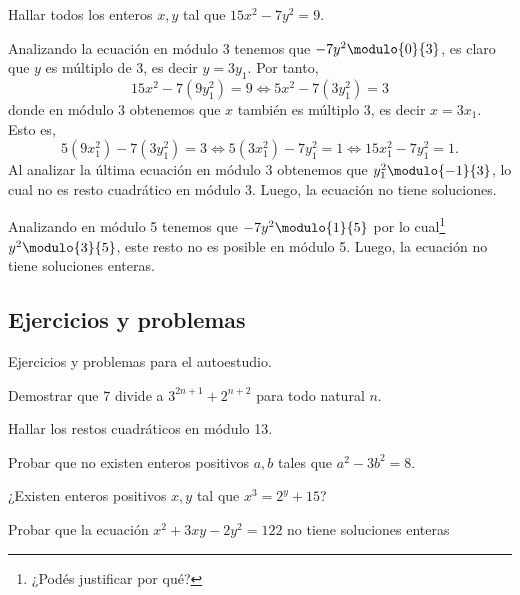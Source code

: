 \begin{example}
    Hallar todos los enteros $x,y$ tal que $15x^2 - 7y^2 = 9$.
\end{example}
\begin{solution}[1]
    Analizando la ecuación en módulo 3 tenemos que $-7y^2 \modulo{0}{3}$, es claro que $y$ es múltiplo de 3, es decir $y = 3y_1$.
    Por tanto,
    \[
        15x^2 - 7(9y_1^2) = 9 \iff 5x^2 - 7(3y_1^2) = 3
    \]
    donde en módulo 3 obtenemos que $x$ también es múltiplo 3, es decir $x = 3x_1$.
    Esto es,
    \[
        5(9x_1^2) - 7(3y_1^2) = 3 \iff 5(3x_1^2) - 7y_1^2 = 1 \iff 15x_1^2 - 7y_1^2 = 1.
    \]
    Al analizar la última ecuación en módulo 3 obtenemos que $y_1^2 \modulo{-1}{3}$, lo cual no es resto cuadrático en módulo 3.
    Luego, la ecuación no tiene soluciones.
\end{solution}

\begin{solution}[2]
    Analizando en módulo 5 tenemos que $-7y^2 \modulo{1}{5}$ por lo cual\footnote{¿Podés justificar por qué?} $y^2 \modulo{3}{5}$,
    este resto no es posible en módulo 5.
    Luego, la ecuación no tiene soluciones enteras.
\end{solution}


\subsection{Ejercicios y problemas}

Ejercicios y problemas para el autoestudio.

\begin{exercise}
    Demostrar que 7 divide a $3^{2n + 1} + 2^{n + 2}$ para todo natural $n$.
\end{exercise}

\begin{exercise}
    Hallar los restos cuadráticos en módulo 13.
\end{exercise}

\begin{exercise}
    Probar que no existen enteros positivos $a,b$ tales que $a^2 - 3b^2 = 8$.
\end{exercise}

\begin{exercise}
    ¿Existen enteros positivos $x,y$ tal que $x^3 = 2^y + 15$?
\end{exercise}

\begin{exercise}
    Probar que la ecuación $x^2 + 3xy - 2y^2 = 122$ no tiene soluciones enteras
\end{exercise}

